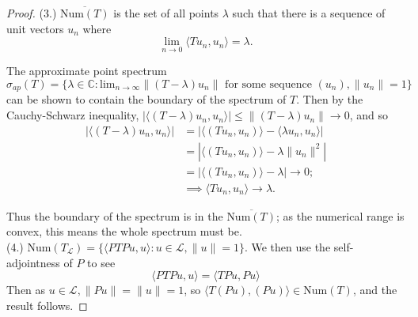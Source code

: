 \documentclass{article}
\newcommand{\Num}{\text{Num}}
\begin{document}
\begin{proof}
(3.) $\overline{\text{Num}(T)}$ is the set of all points $\lambda$ such that there is a sequence of unit vectors $u_n$ where
$$\lim_{n\rightarrow0}\langle Tu_n, u_n \rangle = \lambda.$$

The approximate point spectrum
$\sigma_{ap}(T) = \{\lambda \in \mathbb{C}: \text{lim}_{n \rightarrow \infty}\|(T - \lambda)u_n\| \text{ for some sequence } (u_n), \|u_n\| = 1\}$
can be shown to contain the boundary of the spectrum of $T$. Then by the Cauchy-Schwarz inequality,
$|\langle (T - \lambda)u_n, u_n \rangle| \leq \|(T - \lambda)u_n\| \rightarrow 0$, and so
\begin{equation*}
\begin{split}
|\langle (T - \lambda)u_n, u_n \rangle| &  = |\langle (Tu_n, u_n) \rangle - \langle \lambda u_n, u_n \rangle| \\
& = |\langle (Tu_n, u_n) \rangle - \lambda \|u_n\|^2| \\
& = |\langle (Tu_n, u_n) \rangle - \lambda| \rightarrow 0; \\
& \implies \langle Tu_n, u_n \rangle \rightarrow \lambda.
\end{split}
\end{equation*}

Thus the boundary of the spectrum is in the $\overline{\Num(T)}$; as the numerical range is convex,
this means the whole spectrum must be.\\

(4.) $\Num(T_\mathcal{L}) = \{\langle PTPu, u \rangle : u \in \mathcal{L}, \|u\|=1\}$.
We then use the self-adjointness of $P$ to see
$$\langle PTPu, u \rangle = \langle TPu, Pu \rangle$$
Then as $u \in \mathcal{L}, \|Pu\| = \|u\| = 1$,
so $\langle T(Pu), (Pu) \rangle \in \text{Num}(T)$, and the result follows.

\end{proof}

\printbibliography
\end{document}

